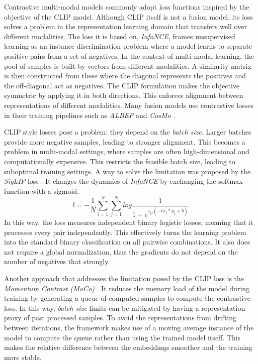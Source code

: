 Contrastive multi-modal models commonly adopt loss functions inspired by the objective of the CLIP \cite{radford2021learningtransferablevisualmodels} model.
Although CLIP itself is not a fusion model, its loss solves a problem in the representation learning domain that transfers well over different modalities.
The loss it is based on, \textit{InfoNCE}, frames unsupervised learning as an instance discrimination problem where a model learns to separate positive pairs from a set of negatives.
In the context of multi-modal learning, the pool of samples is built by vectors from different modalities.
A similarity matrix is then constructed from these where the diagonal represents the positives and the off-diagonal act as negatives.
The CLIP formulation makes the objective symmetric by applying it in both directions.
This enforces alignment between representations of different modalities.
Many fusion models use contrastive losses in their training pipelines such as \textit{ALBEF} \cite{li2021alignfusevisionlanguage} and \textit{CosMo} \cite{wang2024cosmocontrastivestreamlinedmultimodal}.

CLIP style losses pose a problem: they depend on the \textit{batch size}.
Larger batches provide more negative samples, leading to stronger alignment.
This becomes a problem in multi-modal settings, where samples are often high-dimensional and computationally expensive.
This restricts the feasible batch size, leading to suboptimal training settings.
A way to solve the limitation was proposed by the \textit{SigLIP} loss \cite{zhai2023sigmoidlosslanguageimage}.
It changes the dynamics of \textit{InfoNCE} by exchanging the softmax function with a sigmoid.
$$l = - \frac{1}{N} \sum_{i=1}^{N} \sum_{j=1}^{N} log{\frac{1}{1 + e^{z_{ij}(-tx_i * y_j + b)}}}$$
In this way, the loss measures independent binary logistic losses, meaning that it processes every pair independently.
This effectively turns the learning problem into the standard binary classification on all pairwise combinations.
It also does not require a global normalization, thus the gradients do not depend on the number of negatives that strongly.

Another approach that addresses the limitation posed by the CLIP loss is the \textit{Momentum Contrast (MoCo)} \cite{he2020momentumcontrastunsupervisedvisual}.
It reduces the memory load of the model during training by generating a queue of computed samples to compute the contrastive loss.
In this way, \textit{batch size} limits can be mitigated by having a representation proxy of past processed samples.
To avoid the representations from drifting between iterations, the framework makes use of a moving average instance of the model to compute the queue rather than using the trained model itself.
This makes the relative difference between the embeddings smoother and the training more stable.

